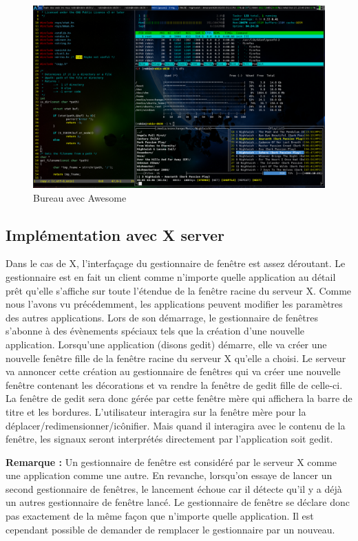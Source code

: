 \begin{figure}[H]
  \centering
    \includegraphics[width=\linewidth]{figures/adrien}
  \caption{Bureau avec Awesome}
  \label{fig:adrien}
\end{figure}

\subsection{Implémentation avec X server}

Dans le cas de X, l’interfaçage du gestionnaire de fenêtre est assez déroutant. Le gestionnaire est en fait un client comme n’importe quelle application au détail prêt qu’elle s’affiche sur toute l’étendue de la fenêtre racine du serveur X. Comme nous l’avons vu précédemment, les applications peuvent modifier les paramètres des autres applications. Lors de son démarrage, le gestionnaire de fenêtres s’abonne à des évènements spéciaux tels que la création d’une nouvelle application. Lorsqu’une application (disons gedit) démarre, elle va créer une nouvelle fenêtre fille de la fenêtre racine du serveur X qu’elle a choisi. Le serveur va annoncer cette création au gestionnaire de fenêtres qui va créer une nouvelle fenêtre contenant les décorations et va rendre la fenêtre de gedit fille de celle-ci. La fenêtre de gedit sera donc gérée par cette fenêtre mère qui affichera la barre de titre et les bordures. L’utilisateur interagira sur la fenêtre mère pour la déplacer/redimensionner/icônifier. Mais quand il interagira avec le contenu de la fenêtre, les signaux seront interprétés directement par l’application soit gedit.

\textbf{Remarque :} Un gestionnaire de fenêtre est considéré par le serveur X comme une application comme une autre. En revanche, lorsqu’on essaye de lancer un second gestionnaire de fenêtres, le lancement échoue car il détecte qu’il y a déjà un autres gestionnaire de fenêtre lancé. Le gestionnaire de fenêtre se déclare donc pas exactement de la même façon que n'importe quelle application. Il est cependant possible de demander de remplacer le gestionnaire par un nouveau.

